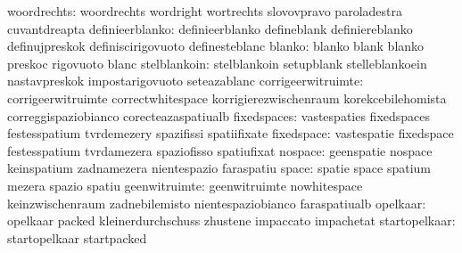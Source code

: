                      woordrechts: woordrechts                      wordright
                                  wortrechts                       slovovpravo
                                  paroladestra                     cuvantdreapta
                 definieerblanko: definieerblanko                  defineblank
                                  definiereblanko                  definujpreskok
                                  definiscirigovuoto               definesteblanc
                          blanko: blanko                           blank
                                  blanko                           preskoc
                                  rigovuoto                        blanc
                    stelblankoin: stelblankoin                     setupblank
                                  stelleblankoein                  nastavpreskok
                                  impostarigovuoto                 seteazablanc
              corrigeerwitruimte: corrigeerwitruimte               correctwhitespace
                                  korrigierezwischenraum           korekcebilehomista
                                  correggispaziobianco             corecteazaspatiualb
                     fixedspaces: vastespaties                     fixedspaces
                                  festesspatium                    tvrdemezery
                                  spazifissi                       spatiifixate
                      fixedspace: vastespatie                      fixedspace
                                  festesspatium                    tvrdamezera
                                  spaziofisso                      spatiufixat
                         nospace: geenspatie                       nospace
                                  keinspatium                      zadnamezera
                                  nientespazio                     faraspatiu
                           space: spatie                           space
                                  spatium                          mezera
                                  spazio                           spatiu
                   geenwitruimte: geenwitruimte                    nowhitespace
                                  keinzwischenraum                 zadnebilemisto
                                  nientespaziobianco               faraspatiualb
                        opelkaar: opelkaar                         packed
                                  kleinerdurchschuss               zhustene
                                  impaccato                        impachetat
                   startopelkaar: startopelkaar                    startpacked
